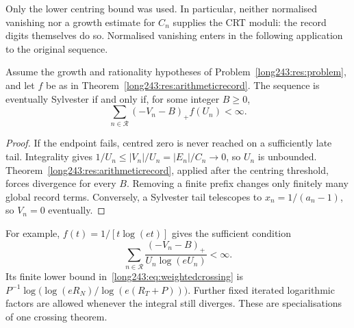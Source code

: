 \documentclass[11pt]{article}
\begin{document}
Only the lower centring bound was used. In particular, neither normalised
vanishing nor a growth estimate for $C_n$ supplies the CRT moduli: the
record digits themselves do so. Normalised vanishing enters in the following
application to the original sequence.

\begin{theorem}\label{long243:res:weightedrecord}
Assume the growth and rationality hypotheses of Problem~\ref{long243:res:problem},
and let $f$ be as in Theorem~\ref{long243:res:arithmeticrecord}. The sequence is
eventually Sylvester if and only if, for some integer $B\ge0$,
\[
 \sum_{n\in\mathcal R}(-V_n-B)_+f(U_n)<\infty.
\]
\end{theorem}

\begin{proof}
If the endpoint fails, centred zero is never reached on a sufficiently late
tail. Integrality gives $1/U_n\le|V_n|/U_n=|E_n|/C_n\to0$, so $U_n$ is
unbounded. Theorem~\ref{long243:res:arithmeticrecord}, applied after the centring
threshold, forces divergence for every $B$. Removing a finite prefix changes
only finitely many global record terms. Conversely, a Sylvester tail
telescopes to $x_n=1/(a_n-1)$, so $V_n=0$ eventually.
\end{proof}

For example, $f(t)=1/[t\log(et)]$ gives the sufficient condition
\[
 \sum_{n\in\mathcal R}\frac{(-V_n-B)_+}{U_n\log(eU_n)}<\infty.
\]
Its finite lower bound in~\eqref{long243:eq:weightedcrossing} is
$P^{-1}\log\bigl(\log(eR_N)/\log(e(R_T+P))\bigr)$.
Further fixed iterated logarithmic factors are allowed whenever the integral
still diverges. These are specialisations of one crossing theorem.
\end{document}
